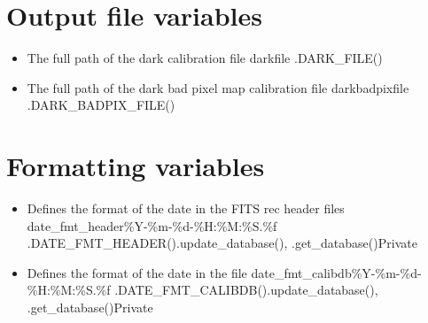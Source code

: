 \fi


\ifdevguide
\clearpage
\newpage
\section{Output file variables}
\label{ch:variables:formatting}


\begin{itemize}
	\item {} 
	{The full path of the dark calibration file}
	{darkfile}
	{\calDARK}{\spirouConst.DARK\_FILE()}{\calDARK}
\end{itemize}


\begin{itemize}
	\item {} 
	{The full path of the dark bad pixel map calibration file}
	{darkbadpixfile}
	{\calDARK}{\spirouConst.DARK\_BADPIX\_FILE()}{\calDARK}
\end{itemize}


\fi

\ifdevguide
\clearpage
\newpage
\section{Formatting variables}
\label{ch:variables:formatting}

\begin{itemize}

\item {}
{Defines the format of the date in the FITS rec header files}
{date\_fmt\_header}{\%Y-\%m-\%d-\%H:\%M:\%S.\%f}
{\spirouCDB}{\spirouConst.DATE\_FMT\_HEADER()}{\spirouCDB.update\_database(), \spirouCDB.get\_database()}{Private}


\item {}
{Defines the format of the date in the \calibdb file}
{date\_fmt\_calibdb}{\%Y-\%m-\%d-\%H:\%M:\%S.\%f}
{\spirouCDB}{\spirouConst.DATE\_FMT\_CALIBDB()}{\spirouCDB.update\_database(), \spirouCDB.get\_database()}{Private}

\end{itemize}

